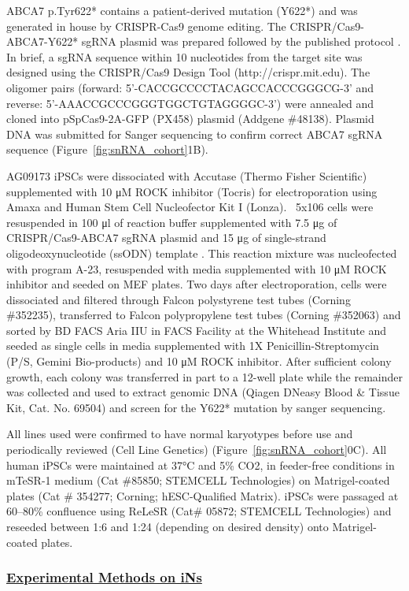 \documentclass[12pt]{article}
\begin{document}
ABCA7 p.Tyr622* contains a patient-derived mutation (Y622*) \cite{De_Roeck2019-ee} and was generated in house by CRISPR-Cas9 genome editing. The CRISPR/Cas9-ABCA7-Y622* sgRNA plasmid was prepared followed by the published protocol \cite{Ran2013-sf}. In brief, a sgRNA sequence within 10 nucleotides from the target site was designed using the CRISPR/Cas9 Design Tool (http://crispr.mit.edu). The oligomer pairs (forward: 5’-CACCGCCCCTACAGCCACCCGGGCG-3’ and reverse: 5’-AAACCGCCCGGGTGGCTGTAGGGGC-3’) were annealed and cloned into pSpCas9-2A-GFP (PX458) plasmid (Addgene \#48138). Plasmid DNA was submitted for Sanger sequencing to confirm correct ABCA7 sgRNA sequence (Figure~\ref{fig:snRNA_cohort}1B).

AG09173 iPSCs were dissociated with Accutase (Thermo Fisher Scientific) supplemented with 10 μM ROCK inhibitor (Tocris) for electroporation using Amaxa and Human Stem Cell Nucleofector Kit I (Lonza). ~5x106 cells were resuspended in 100 μl of reaction buffer supplemented with 7.5 μg of CRISPR/Cas9-ABCA7 sgRNA plasmid and 15 μg of single-strand oligodeoxynucleotide (ssODN) template . This reaction mixture was nucleofected with program A-23, resuspended with media supplemented with 10 μM ROCK inhibitor and seeded on MEF plates. Two days after electroporation, cells were dissociated and filtered through Falcon polystyrene test tubes (Corning \#352235), transferred to Falcon polypropylene test tubes (Corning \#352063) and sorted by BD FACS Aria IIU in FACS Facility at the Whitehead Institute and seeded as single cells in media supplemented with 1X Penicillin-Streptomycin (P/S, Gemini Bio-products) and 10 μM ROCK inhibitor. After sufficient colony growth, each colony was transferred in part to a 12-well plate while the remainder was collected and used to extract genomic DNA (Qiagen DNeasy Blood & Tissue Kit, Cat. No. 69504) and screen for the Y622* mutation by sanger sequencing.

All lines used were confirmed to have normal karyotypes before use and periodically reviewed (Cell Line Genetics) (Figure~\ref{fig:snRNA_cohort}0C). All human iPSCs were maintained at 37°C and 5\% CO2, in feeder-free conditions in mTeSR-1 medium (Cat \#85850; STEMCELL Technologies) on Matrigel-coated plates (Cat \# 354277; Corning; hESC-Qualified Matrix). iPSCs were passaged at 60–80\% confluence using ReLeSR (Cat\# 05872; STEMCELL Technologies) and reseeded between 1:6 and 1:24 (depending on desired density) onto Matrigel-coated plates. \subsubsection{\underline{Experimental Methods on iNs}} 
\end{document}
